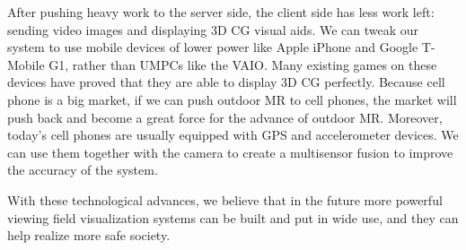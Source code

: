 After pushing heavy work to the server side, the client side has less work left: sending video images and displaying 3D CG visual aids. We can tweak our system to use mobile devices of lower power like Apple iPhone and Google T-Mobile G1, rather than UMPCs like the VAIO. Many existing games on these devices have proved that they are able to display 3D CG perfectly. Because cell phone is a big market, if we can push outdoor MR to cell phones, the market will push back and become a great force for the advance of outdoor MR. Moreover, today's cell phones are usually equipped with GPS and accelerometer devices. We can use them together with the camera to create a multisensor fusion \cite{Reference14} to improve the accuracy of the system.

With these technological advances, we believe that in the future more powerful viewing field visualization systems can be built and put in wide use, and they can help realize more safe society.
